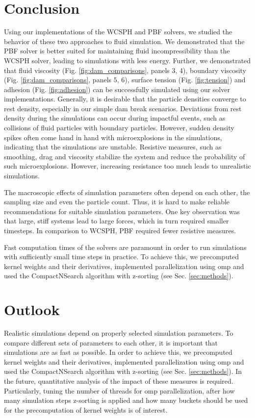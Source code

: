 \documentclass[11pt, letterpaper, twocolumn]{article}
\begin{document}
\section{Conclusion}
\label{sec:conclusion}
Using our implementations of the WCSPH and PBF solvers, we studied the behavior of these two approaches to fluid simulation. We demonstrated that the PBF solver is better suited for maintaining fluid incompressibility than the WCSPH solver, leading to simulations with less energy. Further, we demonstrated
that fluid viscosity (Fig. \ref{fig:dam_comparisons}, panels 3, 4), boundary viscosity (Fig. \ref{fig:dam_comparisons}, panels 5, 6), surface tension (Fig. \ref{fig:tension}) and adhesion (Fig. \ref{fig:adhesion}) can be successfully simulated using our solver implementations. Generally, it is desirable that 
the particle densities converge to rest density, especially in our simple dam break scenarios. Deviations from rest density during the simulations can occur during impactful events, such as collisions of fluid particles with boundary particles. However, sudden density spikes often come hand in hand with microexplosions
in the simulations, indicating that the simulations are unstable. Resistive measures, such as smoothing, drag and viscosity stabilize the system and reduce the probability of such microexplosions. However, increasing resistance too much leads to unrealistic simulations. 

The macroscopic effects of simulation parameters often depend on each other, the sampling size and even the particle count. Thus, it is hard to make reliable recommendations for suitable simulation parameters. One key observation was that large, stiff systems lead to large forces, which in turn required smaller timesteps. 
In comparison to WCSPH, PBF required fewer resistive measures.

Fast computation times of the solvers are paramount in order to run simulations with sufficiently small time steps in practice. To achieve this, we precomputed kernel weights and their derivatives, implemented parallelization using omp and used the CompactNSearch algorithm with z-sorting (see Sec. \ref{sec:methods}).
 

\section{Outlook}
\label{sec:future}
Realistic simulations depend on properly selected simulation parameters. To compare different sets of parameters to each other, it is important that simulations are as fast as possible. In order to achieve this, we precomputed kernel weights and their derivatives, implemented parallelization using omp and used the CompactNSearch algorithm with z-sorting (see Sec. \ref{sec:methods}).
In the future, quantitative analysis of the impact of these measures is required. Particularly, tuning the number of threads for omp parallelization, after how many simulation steps z-sorting is applied and how many buckets should be used for the precomputation of kernel weights is of interest. 
\end{document}

